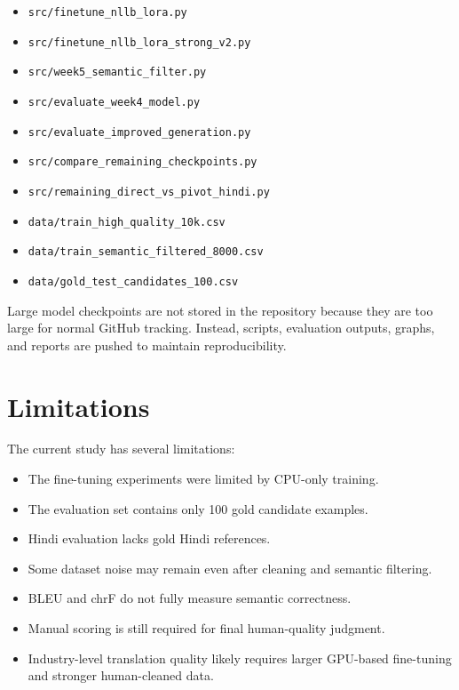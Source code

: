 \documentclass[conference]{IEEEtran}
\begin{document}
\begin{itemize}
    \item \texttt{src/finetune\_nllb\_lora.py}
    \item \texttt{src/finetune\_nllb\_lora\_strong\_v2.py}
    \item \texttt{src/week5\_semantic\_filter.py}
    \item \texttt{src/evaluate\_week4\_model.py}
    \item \texttt{src/evaluate\_improved\_generation.py}
    \item \texttt{src/compare\_remaining\_checkpoints.py}
    \item \texttt{src/remaining\_direct\_vs\_pivot\_hindi.py}
    \item \texttt{data/train\_high\_quality\_10k.csv}
    \item \texttt{data/train\_semantic\_filtered\_8000.csv}
    \item \texttt{data/gold\_test\_candidates\_100.csv}
\end{itemize}

Large model checkpoints are not stored in the repository because they are too large for normal GitHub tracking. Instead, scripts, evaluation outputs, graphs, and reports are pushed to maintain reproducibility.

\section{Limitations}

The current study has several limitations:

\begin{itemize}
    \item The fine-tuning experiments were limited by CPU-only training.
    \item The evaluation set contains only 100 gold candidate examples.
    \item Hindi evaluation lacks gold Hindi references.
    \item Some dataset noise may remain even after cleaning and semantic filtering.
    \item BLEU and chrF do not fully measure semantic correctness.
    \item Manual scoring is still required for final human-quality judgment.
    \item Industry-level translation quality likely requires larger GPU-based fine-tuning and stronger human-cleaned data.
\end{itemize}
\end{document}
